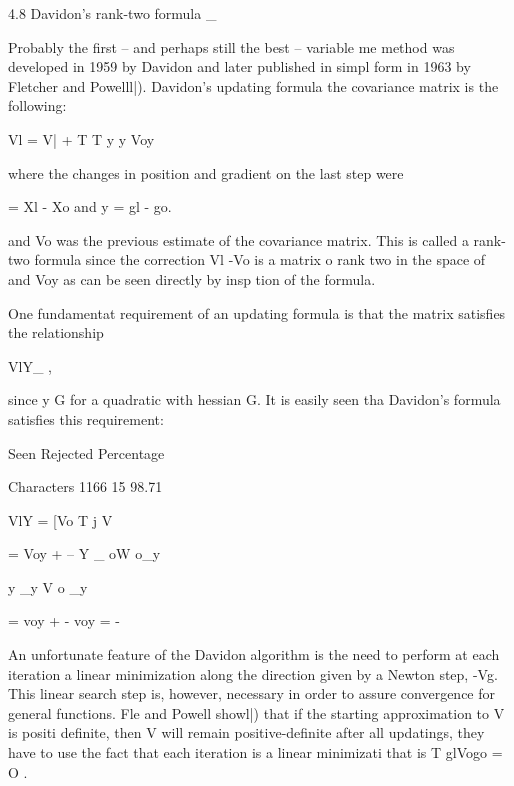  
4.8  Davidon's rank-two formula
    _
 
     Probably the first -- and perhaps still the best -- variable me
method was developed in 1959 by Davidon and later published in simpl
form in 1963 by Fletcher and Powelll|).  Davidon's updating formula
the covariance matrix is the following:
 
 
                        Vl = V| +  T     T
                              y y Voy
 
 
where the changes in position and gradient on the last step were
 
                               = Xl - Xo
and
y = gl - go.
 
and Vo was the previous estimate of the covariance matrix.  This is
called a rank-two formula since the correction Vl -Vo is a matrix o
rank two in the space of  and Voy as can be seen directly by insp
tion of the formula.
 
     One fundamentat requirement of an updating formula is that the
matrix satisfies the relationship
 
                              VlY_ ,
 
since y  G for a quadratic with hessian G.  It is easily seen tha
Davidon's formula satisfies this requirement:
 
                 Seen Rejected  Percentage
 
Characters       1166       15   98.71
 
 
VlY = [Vo    T
          j    V
 
 
 
 
 
   = Voy + -- Y _ oW o_y
 
                                     y    _y V o _y
 
 
 
 
 
 
 
 
 
 
 
 
 
 
 
 
 
 
                       = voy +  - voy =  -
 
 
 
     An unfortunate feature of the Davidon algorithm is the need to
perform at each iteration a linear minimization along the direction
given by a Newton step, -Vg.  This linear search step is, however,
necessary in order to assure convergence for general functions.  Fle
and Powell showl|) that if the starting approximation to V is positi
definite, then V will remain positive-definite after all updatings,
they have to use the fact that each iteration is a linear minimizati
that is                         T
                                              glVogo = O .
 
